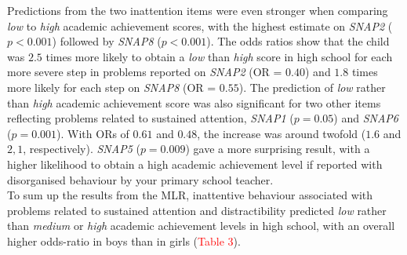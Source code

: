 \documentclass[10pt,letterpaper]{article}
\begin{document}
{{Predictions from the two inattention items were even stronger when comparing {\it low} to {\it high} academic achievement scores, with the highest estimate on {\it SNAP2} ($p < 0.001$) 
followed by {\it SNAP8} ($p < 0.001$).  The odds ratios show that the child was $2.5$ times more likely to obtain a {\it low} than {\it high} score in high school for each more severe step in problems reported on {\it SNAP2} (OR = $0.40$) and  $1.8$ times more likely for each step on {\it SNAP8} (OR = $0.55$).  
The prediction of {\it low} rather than {\it high} academic achievement score was also significant for two other items reflecting problems related to sustained attention, {\it SNAP1} ($p = 0.05$) and {\it SNAP6} ($p = 0.001$). { With ORs of $0.61$ and $0.48$, the increase was around twofold ($1.6$ and $2,1$, respectively). \it SNAP5} ($p = 0.009$) gave a more surprising result, with a higher likelihood to obtain a high academic achievement level if reported with disorganised behaviour by your primary school teacher.\\

To sum up the results from the MLR, inattentive behaviour associated with problems related to sustained attention and distractibility predicted {\it low} rather than {\it medium}
or {\it high} academic achievement levels in high school, with an overall higher odds-ratio in boys than in girls (\textcolor{red}{Table 3}). \\



  

\vspace{5mm}

}}
\end{document}
